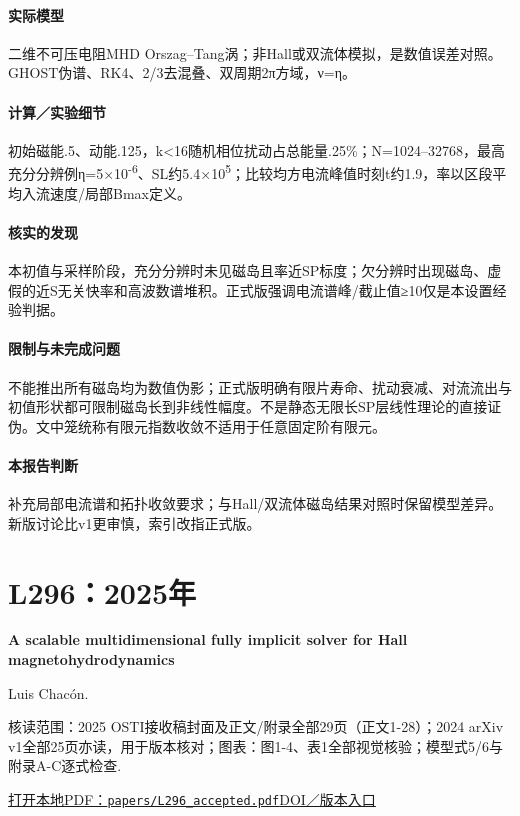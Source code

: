 \paragraph{实际模型}二维不可压电阻MHD Orszag–Tang涡；非Hall或双流体模拟，是数值误差对照。GHOST伪谱、RK4、2/3去混叠、双周期2π方域，ν=η。

\paragraph{计算／实验细节}初始磁能.5、动能.125，k<16随机相位扰动占总能量.25\%；N=1024–32768，最高充分分辨例η=5×10\textsuperscript{-6}、SL约5.4×10\textsuperscript{5}；比较均方电流峰值时刻t约1.9，率以区段平均入流速度/局部Bmax定义。

\paragraph{核实的发现}本初值与采样阶段，充分分辨时未见磁岛且率近SP标度；欠分辨时出现磁岛、虚假的近S无关快率和高波数谱堆积。正式版强调电流谱峰/截止值≥10仅是本设置经验判据。

\paragraph{限制与未完成问题}不能推出所有磁岛均为数值伪影；正式版明确有限片寿命、扰动衰减、对流流出与初值形状都可限制磁岛长到非线性幅度。不是静态无限长SP层线性理论的直接证伪。文中笼统称有限元指数收敛不适用于任意固定阶有限元。

\paragraph{本报告判断}补充局部电流谱和拓扑收敛要求；与Hall/双流体磁岛结果对照时保留模型差异。新版讨论比v1更审慎，索引改指正式版。

\section{L296：2025年}\label{paper:L296}

\textbf{A scalable multidimensional fully implicit solver for Hall magnetohydrodynamics}\citep{L296}\

Luis Chacón.

\textsf{核读范围：}2025 OSTI接收稿封面及正文/附录全部29页（正文1-28）；2024 arXiv v1全部25页亦读，用于版本核对；\textsf{图表：}图1-4、表1全部视觉核验；模型式5/6与附录A-C逐式检查.

\href{run:papers/L296_accepted.pdf}{打开本地PDF：\texttt{papers/L296\_accepted.pdf}}\quad\href{https://doi.org/10.1016/j.jcp.2025.113789}{DOI／版本入口}

